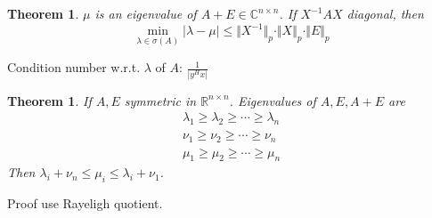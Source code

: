 \documentclass[12pt,b5paper,notitlepage]{article}
\theoremstyle{definition}
\theoremstyle{remark}
\theoremstyle{plain}
\newtheorem{theorem}[definition]{Theorem}
\newcommand{\Cbb}{\mathbb C}
\newcommand{\Rbb}{\mathbb R}
\newcommand{\dps}{\displaystyle}
\numberwithin{equation}{section}
\renewcommand{\|}{\Vert}
\begin{document}
\begin{theorem}
   $ \mu  $ is an eigenvalue of  $ A+E\in \Cbb^{n\times n} $. If  $ X^{-1}AX $ diagonal, then 
   \[\min_{\lambda\in \sigma(A)}|\lambda-\mu| \leq \|X^{-1}\|_p\cdot\|X\|_p\cdot\|E\|_p\] 
\end{theorem}
Condition number w.r.t.  $\lambda $ of  $ A $: $ \dps\frac{1}{|y^Hx|} $  
\begin{theorem}
  If  $ A,E $ symmetric in  $ \Rbb^{n\times n} $. Eigenvalues of  $ A,E,A+E $ are 
  \begin{align*}
    \lambda_1 \geq \lambda_2 \geq \cdots \geq \lambda_n\\
    \nu_1 \geq \nu_2 \geq \cdots \geq \nu_n\\
    \mu_1 \geq \mu_2 \geq \cdots \geq \mu_n
  \end{align*}   
  Then  $  \lambda_i+\nu_n\leq \mu_i \leq \lambda_i+\nu_1 $.
\end{theorem} 
Proof use Rayeligh quotient.
\printindex
\newpage
\listoftheorems[ignoreall, show={theorem,proposition}]
\end{document}
